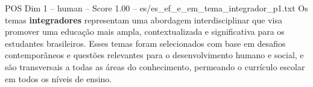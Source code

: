 \begin{textsample}{POS Dim 1 – human – Score 1.00 – es/es\_ef\_e\_em\_tema\_integrador\_p1.txt}  \label{ex:f1_pos_019}
Os temas \textbf{integradores} representam uma abordagem interdisciplinar que visa promover uma educação mais ampla, contextualizada e significativa para os estudantes brasileiros.
Esses temas foram selecionados com base em desafios contemporâneos e questões relevantes para o desenvolvimento humano e social, e são transversais a todas as áreas do conhecimento, permeando o currículo escolar em todos os níveis de ensino.

\end{textsample}
